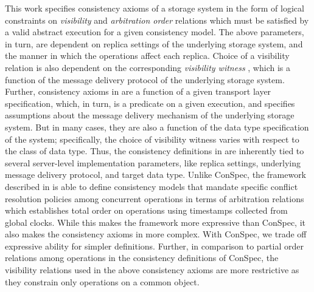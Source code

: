\documentclass[journal,compsoc]{IEEEtran}
\begin{document}
  This work specifies consistency axioms of a storage system in the form of logical constraints on \emph{visibility}  and \emph{arbitration order}  relations which must be satisfied by  a valid abstract execution for a given consistency model.   The above parameters, in turn,  are dependent on replica settings of the underlying storage system, and the manner in which the operations affect each replica.  Choice of a visibility relation is also dependent on the corresponding \emph{visibility witness}  \cite{DBLP:conf/popl/BurckhardtGYZ14},  which is a function of the message delivery protocol  of the underlying storage system. Further, consistency axioms in  \cite{DBLP:conf/popl/BurckhardtGYZ14, understanding-eventual-consistency, Burckhardt:2014:PEC:2693641.2693642}  are a function of a given transport layer specification, which, in turn, is a predicate on a given execution, and  specifies assumptions about the message delivery mechanism of the underlying storage system. But in many cases, they are also a function of the data type specification of the system; specifically,  the choice of visibility witness varies with respect to the class of data type. %
 Thus, the consistency definitions in  \cite{DBLP:conf/popl/BurckhardtGYZ14, understanding-eventual-consistency, Burckhardt:2014:PEC:2693641.2693642} are inherently tied to several server-level implementation parameters, like replica settings, underlying message delivery protocol, and target data type.  Unlike ConSpec, the framework described in  \cite{DBLP:conf/popl/BurckhardtGYZ14, understanding-eventual-consistency, Burckhardt:2014:PEC:2693641.2693642} is able to define consistency models that mandate specific conflict resolution policies among concurrent operations in terms of arbitration relations which establishes total order on operations using timestamps collected from global clocks.  While this makes the framework more expressive than ConSpec, it also makes the consistency axioms in  \cite{DBLP:conf/popl/BurckhardtGYZ14, understanding-eventual-consistency, Burckhardt:2014:PEC:2693641.2693642} more complex. With ConSpec, we trade off expressive ability for  simpler definitions. Further, in comparison to partial order relations among operations in the consistency definitions of ConSpec, the visibility relations used in the above consistency axioms are more restrictive  as they constrain only operations on a common object. 
\end{document}
